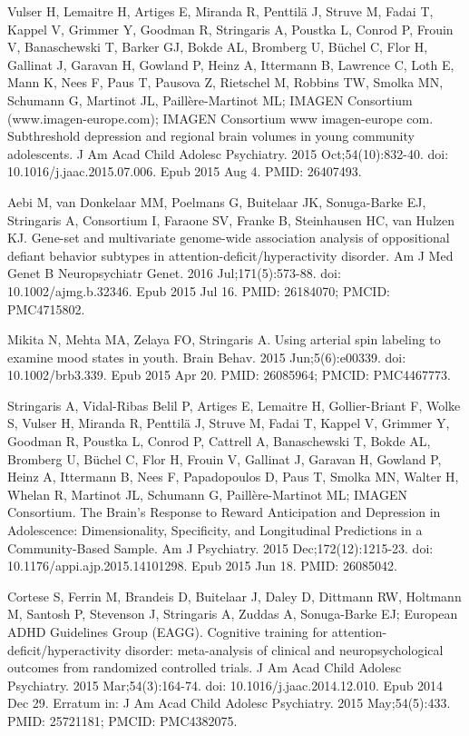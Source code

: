 \documentclass[
]{article}
\begin{document}
Vulser H, Lemaitre H, Artiges E, Miranda R, Penttilä J, Struve M, Fadai
T, Kappel V, Grimmer Y, Goodman R, Stringaris A, Poustka L, Conrod P,
Frouin V, Banaschewski T, Barker GJ, Bokde AL, Bromberg U, Büchel C,
Flor H, Gallinat J, Garavan H, Gowland P, Heinz A, Ittermann B, Lawrence
C, Loth E, Mann K, Nees F, Paus T, Pausova Z, Rietschel M, Robbins TW,
Smolka MN, Schumann G, Martinot JL, Paillère-Martinot ML; IMAGEN
Consortium (www.imagen-europe.com); IMAGEN Consortium www imagen-europe
com. Subthreshold depression and regional brain volumes in young
community adolescents. J Am Acad Child Adolesc Psychiatry. 2015
Oct;54(10):832-40. doi: 10.1016/j.jaac.2015.07.006. Epub 2015 Aug 4.
PMID: 26407493.

Aebi M, van Donkelaar MM, Poelmans G, Buitelaar JK, Sonuga-Barke EJ,
Stringaris A, Consortium I, Faraone SV, Franke B, Steinhausen HC, van
Hulzen KJ. Gene-set and multivariate genome-wide association analysis of
oppositional defiant behavior subtypes in
attention-deficit/hyperactivity disorder. Am J Med Genet B
Neuropsychiatr Genet. 2016 Jul;171(5):573-88. doi: 10.1002/ajmg.b.32346.
Epub 2015 Jul 16. PMID: 26184070; PMCID: PMC4715802.

Mikita N, Mehta MA, Zelaya FO, Stringaris A. Using arterial spin
labeling to examine mood states in youth. Brain Behav. 2015
Jun;5(6):e00339. doi: 10.1002/brb3.339. Epub 2015 Apr 20. PMID:
26085964; PMCID: PMC4467773.

Stringaris A, Vidal-Ribas Belil P, Artiges E, Lemaitre H, Gollier-Briant
F, Wolke S, Vulser H, Miranda R, Penttilä J, Struve M, Fadai T, Kappel
V, Grimmer Y, Goodman R, Poustka L, Conrod P, Cattrell A, Banaschewski
T, Bokde AL, Bromberg U, Büchel C, Flor H, Frouin V, Gallinat J, Garavan
H, Gowland P, Heinz A, Ittermann B, Nees F, Papadopoulos D, Paus T,
Smolka MN, Walter H, Whelan R, Martinot JL, Schumann G,
Paillère-Martinot ML; IMAGEN Consortium. The Brain's Response to Reward
Anticipation and Depression in Adolescence: Dimensionality, Specificity,
and Longitudinal Predictions in a Community-Based Sample. Am J
Psychiatry. 2015 Dec;172(12):1215-23. doi:
10.1176/appi.ajp.2015.14101298. Epub 2015 Jun 18. PMID: 26085042.

Cortese S, Ferrin M, Brandeis D, Buitelaar J, Daley D, Dittmann RW,
Holtmann M, Santosh P, Stevenson J, Stringaris A, Zuddas A, Sonuga-Barke
EJ; European ADHD Guidelines Group (EAGG). Cognitive training for
attention- deficit/hyperactivity disorder: meta-analysis of clinical and
neuropsychological outcomes from randomized controlled trials. J Am Acad
Child Adolesc Psychiatry. 2015 Mar;54(3):164-74. doi:
10.1016/j.jaac.2014.12.010. Epub 2014 Dec 29. Erratum in: J Am Acad
Child Adolesc Psychiatry. 2015 May;54(5):433. PMID: 25721181; PMCID:
PMC4382075.
\end{document}
